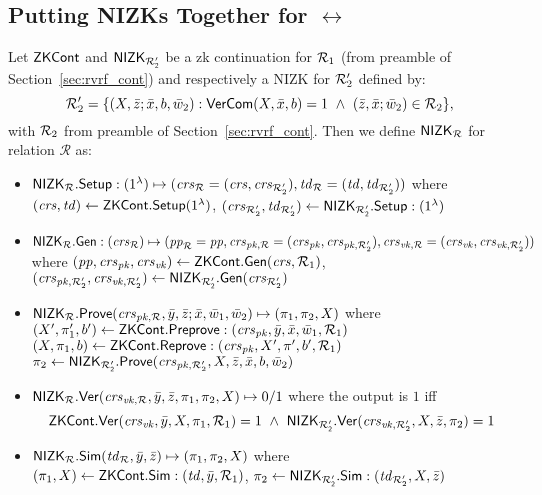 \subsection{Putting NIZKs Together for $\rel$}
Let $\ZKCont$ and $\nizktwo$ be a zk continuation for $\relone$ (from preamble of Section~\ref{sec:rvrf_cont}) and respectively a NIZK 
for $\reltwo'$ defined by:
$$\reltwo' = \{(X, \barz; \barx, b, \baromega_2): \VerifyCom(X, \barx, b) =1 \ \wedge \ (\barz, \barx; \baromega_2) \in \reltwo \},$$
\noindent with $\reltwo$ from preamble of Section~\ref{sec:rvrf_cont}. Then we define $\nizkR$ for relation $\mathcal{R}$ as:
\begin{itemize}
\item $\nizkR.\Setup: (1^{\lambda}) \mapsto (\crsR = (\crs,\crstwo), \twR = (\tw, \twtwo))$ where \\
$(\crs, \tw) \leftarrow \ZKCont.\Setup(1^{\lambda})$, $(\crstwo, \twtwo) \leftarrow \nizktwo.\Setup: (1^{\lambda})$

\item $\nizkR.\Gen: (\crsR) \mapsto (\ppR = \pp, \crspkR = (\crspk,\crspktwo), \crsvkR = (\crsvk,\crsvktwo))$ where 
$(\pp, \crspk, \crsvk) \leftarrow \ZKCont.\Gen(\crs, \relone)$, \\ $(\crspktwo, \crsvktwo) \leftarrow \nizktwo.\Gen(\crstwo)$ 

\item $\nizkR.\Prove(\crspkR,\bary, \barz; \barx, \baromega_1, \baromega_2 ) \mapsto (\pi_1, \pi_2, X)$ where \\
$(X', \pi'_1, b')\leftarrow \ZKCont.\Preprove:(\crspk, \bar{y}, \bar{x}, \baromega_1, \relone)$ \\
$(X, \pi_1, b) \leftarrow \ZKCont.\Reprove: (\crspk, X', \pi', b', \relone)$ \\
$ \pi_2 \leftarrow \nizktwo.\Prove(\crspktwo, X, \barz, \barx, b, \baromega_2)$ 

\item $\nizkR.\Verify(\crsvkR,\bary, \barz, \pi_1, \pi_2, X) \mapsto 0/1$ where the output is $1$ iff 
$$\ZKCont.\Verify(\crsvk, \bar{y}, X, \pi_1, \relone) = 1 \  \wedge \ \nizktwo.\Verify(\crsvktwo, X, \barz, \pi_2) =1$$

\item $\nizkR.\Sim(\twR, \bary, \barz) \mapsto (\pi_1, \pi_2, X)$ where \\
$(\pi_1, X) \leftarrow \ZKCont.\Sim: (\tw, \bary, \relone)$, $\pi_2 \leftarrow \nizktwo.\Sim: (\twtwo, X, \barz)$ 
 \end{itemize}
 
